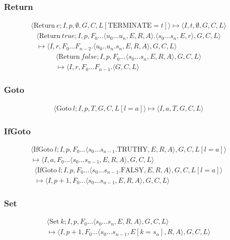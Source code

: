 \subsubsection{Return}
\begin{multline*}
\langle \text{Return}\ e; I, p, \emptyset, G, C, L[\text{TERMINATE}=t]\rangle \mapsto \langle I, t, \emptyset, G, C, L\rangle 
\end{multline*}
\begin{multline*}
\langle \text{Return}\ {true}; I, p, F_0...\langle u_0...u_n, E, R, A\rangle .\langle s_0...s_n, E, r\rangle , G, C, L\rangle  \\ \mapsto \langle I, r, F_0...F_{n-2}.\langle u_0..u_n.s_n, E, R, A\rangle , G, C, L\rangle 
\end{multline*}
\begin{multline*}
\langle \text{Return}\ false; I, p, F_0...\langle s_0...s_n, E, R, A\rangle , G, C, L\rangle  \\ \mapsto \langle I, r, F_0...F_{n-1}.\langle G, C, L\rangle 
\end{multline*}
\subsubsection{Goto}
\begin{multline*}
\langle \text{Goto}\ l; I, p, T, G, C, L[l=a]\rangle \mapsto \langle I, a, T, G, C, L\rangle 
\end{multline*}
\subsubsection{IfGoto}
\begin{multline*}
\langle \text{IfGoto}\ l; I, p, F_0...\langle s_0...s_{n-1}.\text{TRUTHY}, E, R, A\rangle , G, C, L[l=a]\rangle  \\ \mapsto \langle I, a, F_0...\langle s_0...s_{n-1}, E, R, A\rangle , G, C, L\rangle 
\end{multline*}
\begin{multline*}
\langle \text{IfGoto}\ l; I, p, F_0...\langle s_0...s_{n-1}.\text{FALSY}, E, R, A\rangle , G, C, L[l=a]\rangle  \\ \mapsto \langle I, p+1, F_0...\langle s_0...s_{n-1}, E, R, A\rangle , G, C, L\rangle 
\end{multline*}
\subsubsection{Set}
\begin{multline*}
\langle \text{Set}\ k; I, p, F_0...\langle s_0...s_n, E, R, A\rangle , G, C, L\rangle  \\ \mapsto \langle I, p+1, F_0...\langle s_0...s_{n-1}, E[k=s_n], R, A\rangle , G, C, L\rangle 
\end{multline*}
